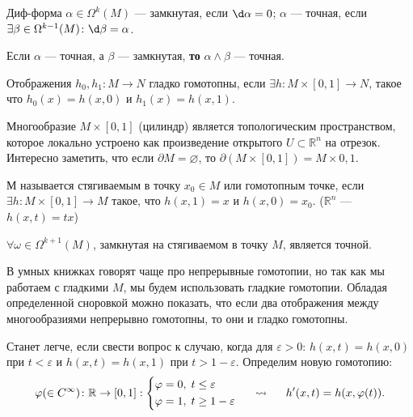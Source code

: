 \begin{to_def}
	Диф-форма $\alpha \in \Omega^k (M)$ --- замкнутая, если $\d \alpha = 0$; $\alpha$ --- точная, если $\exists \beta \in \Omega^{k-1} (M) \colon \d \beta = \alpha$.
	\label{def_7.9}
\end{to_def}

\begin{to_tas}
	Если $\alpha$ --- точная, а $\beta$ --- замкнутая, \textbf{то} $\alpha \wedge \beta$ --- точная.
	\label{tas_7.10}
\end{to_tas}

\begin{to_def}
	Отображения $h_0, h_1 \colon M \rightarrow N$ гладко гомотопны, если $\exists h \colon M \times [0,1] \rightarrow N$, такое что $h_0(x) = h(x,0)$ и $h_1(x) = h(x,1)$.
	\label{def_7.12}
\end{to_def}

Многообразие $M \times [0,1]$ (цилиндр) является топологическим пространством, которое локально устроено как произведение открытого $U\subset \mathbb{R}^n$ на отрезок.
Интересно заметить, что если $\partial M = \varnothing$, то $\partial(M \times [0,1]) = M \times {0,1}$. 

\begin{to_def}
	М называется стягиваемым в точку $x_0 \in M$ или гомотопным точке, если $\exists h \colon M \times [0,1] \rightarrow M$ такое, что $h(x,1) = x$ и $h(x,0) = x_0$. ($\mathbb{R}^n$ --- $h(x,t) = t x$)
\end{to_def}

\begin{to_thr}
	$\forall \omega \in \Omega^{k+1}(M)$, замкнутая на стягиваемом в точку $M$, является точной.
	\label{thr_poin}
\end{to_thr}

В умных книжках говорят чаще про непрерывные гомотопии, но так как мы работаем с гладкими $M$, мы будем использовать гладкие гомотопии. Обладая определенной сноровкой можно показать, что если два отображения между многообразиями непрерывно гомотопны, то они и гладко гомотопны.

Станет легче, если свести вопрос к случаю, когда для $\varepsilon > 0$: $h(x,t) = h(x,0)$ при $t < \varepsilon$ и $h(x,t) = h(x,1)$ при $t > 1-\varepsilon$.
Определим новую гомотопию:
\begin{equation*}
\varphi(\in C^\infty) \colon \mathbb{R} \rightarrow [0,1]:
\left\{
\begin{aligned}
	&\varphi = 0,\; t \leq \varepsilon\\
	&\varphi = 1,\; t \geq 1-\varepsilon
\end{aligned}
\right.
\hspace*{0.5 cm}  \leadsto \hspace*{0.5 cm}
	h'(x,t)=h(x,\varphi(t)).
\end{equation*} 

